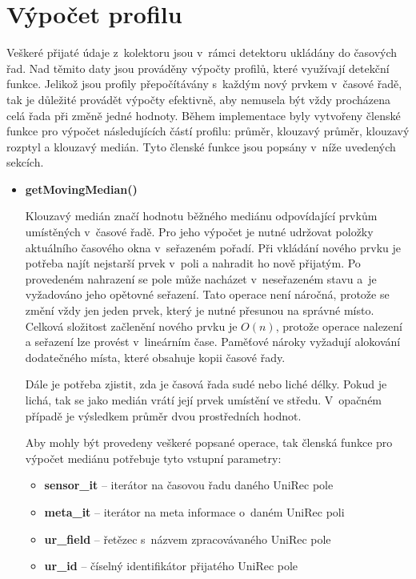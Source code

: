 \section{Výpočet profilu} \label{profileDef}
Veškeré přijaté údaje z~kolektoru jsou v~rámci detektoru ukládány do časových řad. Nad těmito 
daty jsou prováděny výpočty profilů, které využívají detekční funkce. Jelikož jsou profily
přepočítávány s~každým nový prvkem v~časové řadě, tak je důležité provádět výpočty efektivně, 
aby nemusela být vždy procházena celá řada při změně jedné hodnoty. Během implementace byly
vytvořeny členské funkce pro výpočet následujících částí profilu: průměr, klouzavý průměr, klouzavý rozptyl a
klouzavý medián. Tyto členské funkce jsou popsány v~níže uvedených sekcích.

\begin{itemize}
 \item \textbf{getMovingMedian()}%
 
 
 Klouzavý medián značí hodnotu běžného mediánu odpovídající prvkům umístěných v~časové řadě. 
 Pro jeho výpočet je nutné udržovat položky aktuálního časového okna v~seřazeném pořadí.
 Při vkládání nového prvku je potřeba najít nejstarší prvek v~poli a nahradit ho nově přijatým. 
 Po provedeném nahrazení se pole může nacházet v~neseřazeném stavu a~je 
 vyžadováno jeho opětovné seřazení.
  Tato operace není náročná, protože se změní vždy jen jeden prvek, který je nutné
 přesunou na správné místo. Celková složitost začlenění nového prvku je $O(n)$, protože operace 
 nalezení a seřazení lze provést v~lineárním čase. Paměťové nároky vyžadují alokování dodatečného
 místa, které obsahuje kopii časové řady.
 
 Dále je potřeba zjistit, zda je časová řada sudé nebo liché délky. Pokud je lichá, tak se jako 
 medián vrátí její prvek umístění ve středu. V~opačném případě je výsledkem průměr dvou prostředních
 hodnot.
 
 Aby mohly být provedeny veškeré popsané operace, tak členská funkce pro výpočet mediánu
 potřebuje tyto vstupní parametry:
 \begin{itemize}
   \item \textbf{sensor\_it} -- iterátor na časovou řadu daného UniRec pole
   \item \textbf{meta\_it} -- iterátor na meta informace o~daném UniRec poli
   \item \textbf{ur\_field} -- řetězec s~názvem zpracovávaného UniRec pole
   \item \textbf{ur\_id} -- číselný identifikátor přijatého UniRec pole
 \end{itemize}
 

\end{itemize}
